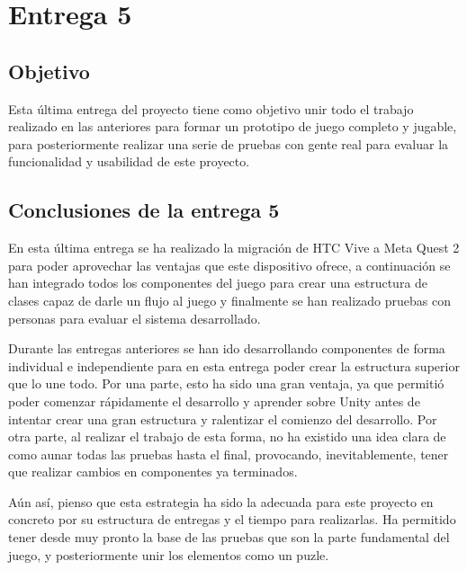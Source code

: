 \section{Entrega 5}



\subsection{Objetivo}

Esta última entrega del proyecto tiene como objetivo unir todo el trabajo realizado en las anteriores para formar un prototipo de juego completo y jugable, para posteriormente realizar una serie de pruebas con gente real para evaluar la funcionalidad y usabilidad de este proyecto.











\subsection{Conclusiones de la entrega 5}



En esta última entrega se ha realizado la migración de HTC Vive a Meta Quest 2 para poder aprovechar las ventajas que este dispositivo ofrece, a continuación se han integrado todos los componentes del juego para crear una estructura de clases capaz de darle un flujo al juego y finalmente se han realizado pruebas con personas para evaluar el sistema desarrollado. 

Durante las entregas anteriores se han ido desarrollando componentes de forma individual e independiente para en esta entrega poder crear la estructura superior que lo une todo. Por una parte, esto ha sido una gran ventaja, ya que permitió poder comenzar rápidamente el desarrollo y aprender sobre Unity antes de intentar crear una gran estructura y ralentizar el comienzo del desarrollo. Por otra parte, al realizar el trabajo de esta forma, no ha existido una idea clara de como aunar todas las pruebas hasta el final, provocando, inevitablemente, tener que realizar cambios en componentes ya terminados.

Aún así, pienso que esta estrategia ha sido la adecuada para este proyecto en concreto por su estructura de entregas y el tiempo para realizarlas. Ha permitido tener desde muy pronto la base de las pruebas que son la parte fundamental del juego, y posteriormente unir los elementos como un puzle.

